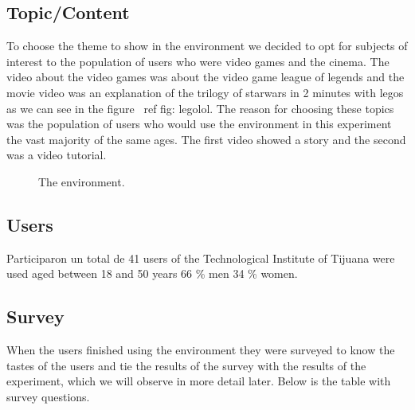 \subsection{Topic/Content}
To choose the theme to show in the environment we decided to opt for subjects of interest to the population of users who were video games and the cinema. The video about the video games was about the video game league of legends and the movie video was an explanation of the trilogy of starwars in 2 minutes with legos as we can see in the figure \ ref {fig: legolol}.
The reason for choosing these topics was the population of users who would use the environment in this experiment the vast majority of the same ages. The first video showed a story and the second was a video tutorial.
\begin{figure}[htbp]
\centering
{}\hspace{10mm}
\caption{The environment.} \label{fig:legolol}
\end{figure}

 
\subsection{Users}
Participaron un total de 41 users of the Technological Institute of Tijuana were used aged between 18 and 50 years 66 \% men 34 \% women. 
\subsection{Survey}

When the users finished using the environment they were surveyed to know the tastes of the users and tie the results of the survey with the results of the experiment, which we will observe in more detail later.
Below is the table with survey questions.

